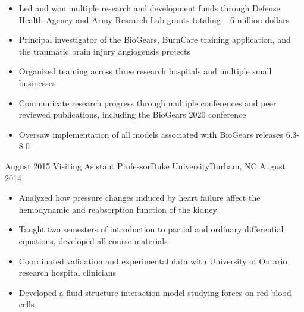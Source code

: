 \begin{experiences}
{\begin{itemize}
                        \item Led and won multiple research and development funds through Defense Health Agency and Army Research Lab grants totaling ~ 6 million dollars  
                        \item Principal investigator of the BioGears, BurnCare training application, and the traumatic brain injury angiogensis projects                
                        \item Organized teaming across three research hospitals and multiple small businesses
                        \item Communicate research progress through multiple conferences and peer reviewed publications, including the BioGears 2020 conference
                        \item Oversaw implementation of all models associated with BioGears releases 6.3-8.0                                                                   
                      \end{itemize}
                    }
                    {}
  \emptySeparator
  \experience
    {August 2015}     {Visiting Asistant Professor}{Duke University}{Durham, NC}
    {August 2014}    {
                      \begin{itemize}
                        \item Analyzed how pressure changes induced by heart failure affect the hemodynamic and reabsorption function of the kidney
                        \item Taught two semesters of introduction to partial and ordinary differential equations, developed all course materials                
                        \item Coordinated validation and experimental data with University of Ontario research hospital clinicians                   
                        \item Developed a fluid-structure interaction model studying forces on red blood cells 
                      \end{itemize}
                    }
                    {}

\end{experiences}
